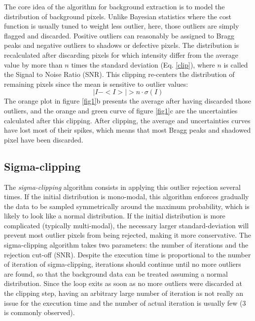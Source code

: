 \documentclass[preprint]{iucr}              %
\begin{document}
The core idea of the algorithm for background extraction is to model the distribution of background pixels. Unlike Bayesian statistics \cite{Sivia2006} where the cost function is usually tuned to weight less outlier, here, those outliers are simply flagged and discarded.
Positive outliers can reasonably be assigned to Bragg peaks and negative outliers to shadows or defective pixels. 
The distribution is recalculated  after discarding pixels for which intensity differ from the average value by more than $n$ times the standard deviation (Eq. \ref{clip}), where $n$ is called the Signal to Noise Ratio (SNR).
This clipping re-centers the distribution of remaining pixels since the mean is sensitive to outlier values:
\begin{equation}
\label{clip}
|I - <I>| > n \cdot \sigma(I)
\end{equation}
The orange plot in figure \ref{fig1}b presents the average after having discarded those outliers, and the orange and green curve of figure \ref{fig1}c are the uncertainties calculated after this clipping. 
After clipping, the average and uncertainties curves have lost most of their spikes, which means that most Bragg peaks and shadowed pixel have been discarded.

\subsection{Sigma-clipping}
The \textit{sigma-clipping} algorithm consists in applying this outlier rejection several times.
If the initial distribution is mono-modal, this algorithm enforces gradually the data to be sampled symmetrically around the maximum probability, which is likely to look like a normal distribution.
If the initial distribution is more complicated (typically multi-modal), the necessary larger standard-deviation will prevent most outlier pixels from being rejected, making it more conservative.
The sigma-clipping algorithm takes two parameters: the number of iterations and the rejection cut-off (SNR).
Despite the execution time is proportional to the number of iteration of sigma-clipping, iterations should continue until no more outliers are found, so that the background data can be treated assuming a normal distribution. 
Since the loop exits as soon as no more outliers were discarded at the clipping step, having an arbitrary large number of iteration is not really an issue for the execution time and the number of actual iteration is usually few (3 is commonly observed).       
\end{document}
